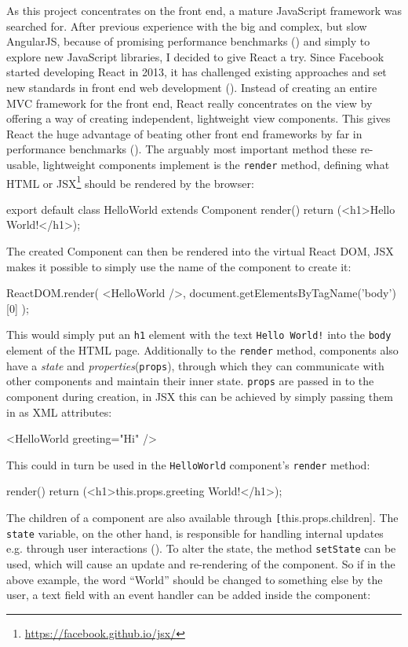As this project concentrates on the front end, a mature JavaScript framework was searched for. After previous experience with the big and complex, but slow AngularJS, because of promising performance benchmarks (\cite{react-benchmarks}) and simply to explore new JavaScript libraries, I decided to give React a try. Since Facebook started developing React in 2013, it has challenged existing approaches and set new standards in front end web development (\cite{introduction-to-react}). Instead of creating an entire MVC framework for the front end, React really concentrates on the view by offering a way of creating independent, lightweight view components. This gives React the huge advantage of beating other front end frameworks by far in performance benchmarks (\cite{react-benchmarks}).
The arguably most important method these re-usable, lightweight components implement is the \texttt{render} method, defining what HTML or JSX\footnote{\url{https://facebook.github.io/jsx/}} should be rendered by the browser:
\begin{JsCode}
export default class HelloWorld extends Component {
  render() {
    return (<h1>Hello World!</h1>);
  }
}
\end{JsCode}
%
The created Component can then be rendered into the virtual React DOM, JSX makes it possible to simply use the name of the component to create it:
%
\begin{JsCode}
ReactDOM.render(
  <HelloWorld />,
  document.getElementsByTagName('body')[0]
);
\end{JsCode}
%
This would simply put an \texttt{h1} element with the text \texttt{Hello World!} into the \texttt{body} element of the HTML page. Additionally to the \texttt{render} method, components also have a \emph{state} and \emph{properties}(\texttt{props}), through which they can communicate with other components and maintain their inner state. \texttt{props} are passed in to the component during creation, in JSX this can be achieved by simply passing them in as XML attributes:
%
\begin{JsCode}
  <HelloWorld greeting="Hi" />
\end{JsCode}
%
This could in turn be used in the \texttt{HelloWorld} component's \texttt{render} method:
%
\begin{JsCode}
  render() {
    return (<h1>{this.props.greeting} World!</h1>);
  }
\end{JsCode}
%
The children of a component are also available through \texttt[this.props.children]. The \texttt{state} variable, on the other hand, is responsible for handling internal updates e.g. through user interactions (\cite{react-docu}). To alter the state, the method \texttt{setState} can be used, which will cause an update and re-rendering of the component. So if in the above example, the word ``World'' should be changed to something else by the user, a text field with an event handler can be added inside the component:
